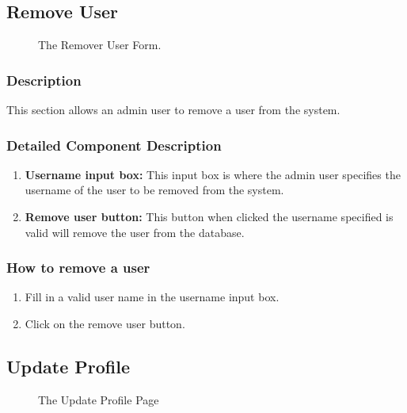 \documentclass[14pt, a4paper]{article}
\begin{document}
\subsection{Remove User}
	\begin{figure}[H]
		\centerline{}
		\caption{The Remover User Form.}
		\label{fig:removeUser1}
	\end{figure}
	\subsubsection{Description} This section allows an admin user to remove a user from the system.
	\subsubsection{Detailed Component Description}
		\begin{enumerate}
			\item \textbf{Username input box:} This input box is where the admin user specifies the username of the user to be removed from the system.
			\item \textbf{Remove user button:} This button when clicked the username specified is valid will remove the user from the database.
		\end{enumerate}
	\subsubsection{How to remove a user}
		\begin{enumerate}
			\item Fill in a valid user name in the username input box.
			\item Click on the remove user button.
		\end{enumerate}
\subsection{Update Profile}
	\begin{figure}[H]
		\centerline{}
		\caption{The Update Profile Page}
		\label{fig:updateProf1}
	\end{figure}
\end{document}
